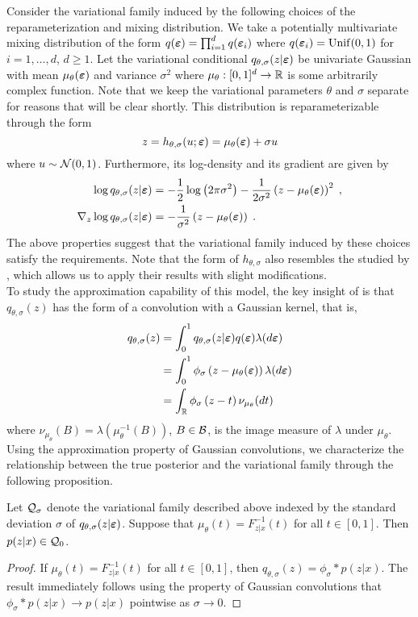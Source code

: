 \documentclass[10pt]{article}
\begin{document}
Consider the \uivi variational family induced by the following choices of the reparameterization and mixing distribution. We take a potentially multivariate mixing distribution of the form $q(\bm{\varepsilon})=\prod_{i=1}^dq(\bm{\varepsilon}_i)$ where $q(\bm{\varepsilon}_i)=\mathrm{Unif}(0,1)$ for $i=1,\ldots,d$, $d\geq 1$. Let the variational conditional $q_{\theta,\sigma}(z|\bm{\varepsilon})$ be univariate Gaussian with mean $\mu_\theta(\bm{\varepsilon})$ and variance $\sigma^2$ where $\mu_\theta:[0,1]^d\rightarrow\mathbb{R}$ is some arbitrarily complex function. Note that we keep the variational parameters $\theta$ and $\sigma$ separate for reasons that will be clear shortly. This distribution is reparameterizable through the form
\[
z = h_{\theta,\sigma}(u;\bm{\varepsilon}) = \mu_\theta(\bm{\varepsilon}) + \sigma u
\]
where $u\sim \mathcal{N}(0,1)$. Furthermore, its log-density and its gradient are given by
\begin{align*}
\log q_{\theta,\sigma}(z|\bm{\varepsilon}) &= -\frac{1}{2}\log\left(2\pi\sigma^2\right)-\frac{1}{2\sigma^2}\left(z-\mu_\theta(\bm{\varepsilon})\right)^2 \;, \\
\nabla_z \log q_{\theta,\sigma}(z|\bm{\varepsilon}) &= -\frac{1}{\sigma^2}\left(z-\mu_\theta(\bm{\varepsilon})\right) \;.
\end{align*}
The above properties suggest that the variational family induced by these choices satisfy the \uivi requirements. Note that the form of $h_{\theta,\sigma}$ also resembles the \nllvm studied by \citet{Plummer:2021}, which allows us to apply their results with slight modifications.
\\

To study the approximation capability of this model, the key insight of \citet{Plummer:2021} is that $q_{\theta,\sigma}(z)$ has the form of a convolution with a Gaussian kernel, that is,
\begin{align*}
q_{\theta,\sigma}(z) &= \int_0^1 q_{\theta,\sigma}(z|\bm{\varepsilon})q(\bm{\varepsilon})\lambda(d\bm{\varepsilon}) \\
&= \int_0^1 \phi_\sigma\left(z-\mu_\theta(\bm{\varepsilon})\right)\lambda(d\bm{\varepsilon}) \\
&= \int_{\mathbb{R}} \phi_\sigma\left(z-t\right)\nu_{\mu_\theta}(dt)
\end{align*}
where $\nu_{\mu_\theta}(B)=\lambda\left(\mu_\theta^{-1}(B)\right)$, $B\in\mathcal{B}$, is the image measure of $\lambda$ under $\mu_\theta$. Using the approximation property of Gaussian convolutions, we characterize the relationship between the true posterior and the variational family through the following proposition.

\begin{proposition} \label{prop:membership}
Let $\mathcal{Q}_\sigma$ denote the variational family described above indexed by the standard deviation $\sigma$ of $q_{\theta,\sigma}(z|\bm{\varepsilon})$. Suppose that $\mu_\theta(t)=F_{z|x}^{-1}(t)$ for all $t\in[0,1]$. Then $p(z|x)\in\mathcal{Q}_0$.
\end{proposition}
\begin{proof}
If $\mu_\theta(t)=F_{z|x}^{-1}(t)$ for all $t\in[0,1]$, then $q_{\theta,\sigma}(z) = \phi_\sigma*p(z|x)$. The result immediately follows using the property of Gaussian convolutions that $\phi_\sigma*p(z|x)\rightarrow p(z|x)$ pointwise as $\sigma\rightarrow0$.
\end{proof}
\end{document}
